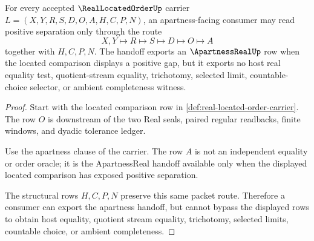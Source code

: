 \begin{theorem}
\label{thm:real-located-order-apartness-handoff}
For every accepted $\RealLocatedOrderUp$ carrier $L=(X,Y,R,S,D,O,A,H,C,P,N)$, an apartness-facing consumer may read positive separation only through the route
$$
X,Y\longmapsto R\longmapsto S\longmapsto D\longmapsto O\longmapsto A
$$
together with $H,C,P,N$. The handoff exports an $\ApartnessRealUp$ row when the located comparison displays a positive gap, but it exports no host real equality test, quotient-stream equality, trichotomy, selected limit, countable-choice selector, or ambient completeness witness.
\end{theorem}
\begin{proof}
Start with the located comparison row in \autoref{def:real-located-order-carrier}. The row $O$ is downstream of the two Real seals, paired regular readbacks, finite windows, and dyadic tolerance ledger.

Use the apartness clause of the carrier. The row $A$ is not an independent equality or order oracle; it is the ApartnessReal handoff available only when the displayed located comparison has exposed positive separation.

The structural rows $H,C,P,N$ preserve this same packet route. Therefore a consumer can export the apartness handoff, but cannot bypass the displayed rows to obtain host equality, quotient stream equality, trichotomy, selected limits, countable choice, or ambient completeness.
\end{proof}





